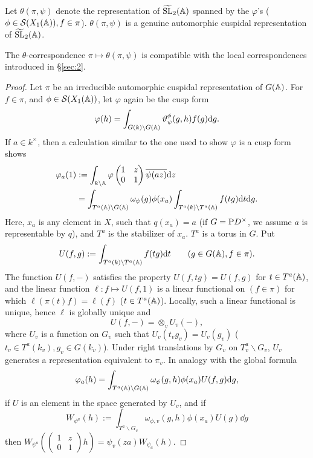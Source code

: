 Let $\theta(\pi, \psi)$ denote the representation of $\widetilde{\mathrm{SL}}_2(\mathbb{A})$ spanned by the $\varphi$'s ($\phi \in \mathcal{S}(X_1(\mathbb{A})), f \in \pi$).
$\theta(\pi, \psi)$ is a genuine automorphic cuspidal representation of $\widetilde{\mathrm{SL}}_2(\mathbb{A})$.

\begin{theorem}
\label{thm:3.1}
The $\theta$-correspondence $\pi \mapsto \theta(\pi, \psi)$ is compatible with the local correspondences introduced in \S \ref{sec:2}.
\end{theorem}

\begin{proof}
Let $\pi$ be an irreducible automorphic cuspidal representation of $G(\mathbb{A})$. For $f \in \pi$, and $\phi \in \mathcal{S}(X_1(\mathbb{A}))$, let $\varphi$ again be the cusp form
\[
\varphi(h) = \int_{G(k) \backslash G(\mathbb{A})} \vartheta_{\psi}^\phi(g, h) f(g) \mathrm{d} g.
\]
If $a \in k^\times$, then a calculation similar to the one used to show $\varphi$ is a cusp form shows
\begin{align}
    \varphi_a(1) &:= \int_{k \backslash \mathbb{A}} \varphi \begin{pmatrix}
        1 & z \\ 0& 1
    \end{pmatrix} \overline{\psi(az)} \mathrm{d} z \nonumber \\ 
    &= \int_{T^a(\mathbb{A}) \backslash G(\mathbb{A})} \omega_\psi(g) \phi(x_a) \int_{T^a(k) \backslash T^a(\mathbb{A})} f(tg) \mathrm{d} t \mathrm{d} g. \label{eqn:F}
\end{align}
Here, $x_a$ is any element in $X$, such that $q(x_a) = a$ (if $G = \mathrm{P} D^\times$, we assume $a$ is representable by $q$), and $T^a$ is the stabilizer of $x_a$.
$T^a$ is a torus in $G$.
Put
\[
U(f, g) := \int_{T^a(k) \backslash T^a(\mathbb{A})} f(tg) \mathrm{d} t\qquad (g \in G(\mathbb{A}), f \in \pi).
\]
The function $U(f, -)$ satisfies the property $U(f, tg) = U(f, g)$ for $t \in T^a(\mathbb{A})$, and the linear function $\ell: f \mapsto U(f, 1)$ is a linear functional on $(f\in \pi)$ for which $\ell(\pi(t)f) = \ell(f)$ ($t \in T^a(\mathbb{A})$).
Locally, such a linear functional is unique, hence $\ell$ is globally unique and
\[
U(f, -) = \otimes_v U_v(-),
\]
where $U_v$ is a function on $G_v$ such that $U_v(t_v g_v) = U_v(g_v)$ ($t_v \in T^a(k_v), g_v \in G(k_v)$).
Under right translations by $G_v$ on $T^a_v \backslash G_v$, $U_v$ generates a representation equivalent to $\pi_v$. In analogy with the global formula
\[
\varphi_a(h) = \int_{T^a(\mathbb{A}) \backslash G(\mathbb{A})} \omega_\psi(g, h) \phi(x_a) U(f, g) \mathrm{d} g,
\]
if $U$ is an element in the space generated by $U_v$, and if
\[
W_{\psi^a}(h) := \int_{T^a \backslash G_v} \omega_{\phi, v}(g, h) \phi(x_a) U(g) \dd g
\]
then $W_{\psi^a}\left(\left(\begin{smallmatrix}
    1 & z \\ 0 & 1
\end{smallmatrix}\right)h\right) = \psi_v(za) W_{\psi_a}(h)$.
\end{proof}

